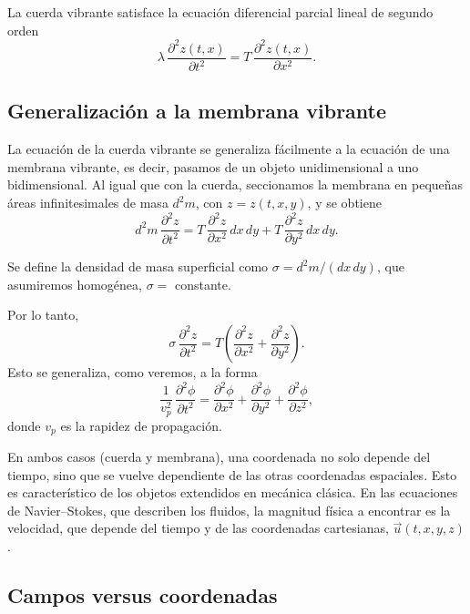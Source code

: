 \begin{proposicionc}
La cuerda vibrante satisface la ecuación diferencial parcial lineal de
segundo orden
\[
\lambda\, \frac{\partial^2 z(t,x)}{\partial t^2} = T\,
\frac{\partial^2 z(t,x)}{\partial x^2} .
\]
\end{proposicionc}

\subsection{Generalización a la membrana vibrante}

La ecuación de la cuerda vibrante se generaliza fácilmente a la ecuación
de una membrana vibrante, es decir, pasamos de un objeto unidimensional a
uno bidimensional. Al igual que con la cuerda, seccionamos la membrana en
pequeñas áreas infinitesimales de masa $d^2m$, con $z=z(t,x,y)$, y se
obtiene
\[
d^2m\, \frac{\partial^2 z}{\partial t^2} = T\,\frac{\partial^2
z}{\partial x^2}\, dx\,dy + T\, \frac{\partial^2 z}{\partial y^2}\,
dx\,dy .
\]

\begin{definicion}
Se define la densidad de masa superficial como $\sigma = d^2m/(dx\,dy)$,
que asumiremos homogénea, $\sigma=$ constante.
\end{definicion}

Por lo tanto,
\[
\sigma\, \frac{\partial^2 z}{\partial t^2} = T\left(\frac{\partial^2
z}{\partial x^2} + \frac{\partial^2 z}{\partial y^2}\right).
\]
Esto se generaliza, como veremos, a la forma
\[
\frac{1}{v_p^2}\, \frac{\partial^2\phi}{\partial t^2} =
\frac{\partial^2\phi}{\partial x^2} + \frac{\partial^2\phi}{\partial
y^2} + \frac{\partial^2\phi}{\partial z^2},
\]
donde $v_p$ es la rapidez de propagación.

\begin{observacion}
En ambos casos (cuerda y membrana), una coordenada no solo depende del
tiempo, sino que se vuelve dependiente de las otras coordenadas
espaciales. Esto es característico de los objetos extendidos en mecánica
clásica. En las ecuaciones de Navier--Stokes, que describen los fluidos,
la magnitud física a encontrar es la velocidad, que depende del tiempo y
de las coordenadas cartesianas, $\vec u(t,x,y,z)$.
\end{observacion}

\subsection{Campos versus coordenadas}


